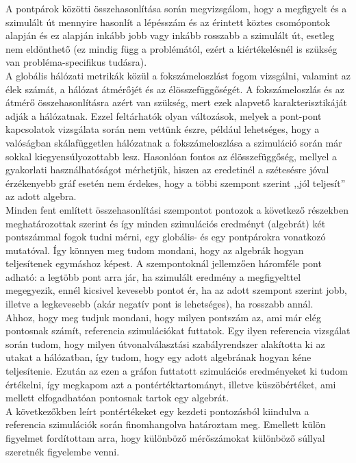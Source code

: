     A pontpárok közötti összehasonlítása során megvizsgálom, hogy a megfigyelt és a szimulált út mennyire hasonlít a lépésszám és az érintett köztes csomópontok alapján és ez alapján inkább jobb vagy inkább rosszabb a szimulált út, esetleg nem eldönthető (ez mindig függ a problémától, ezért a kiértékelésnél is szükség van probléma-specifikus tudásra).\\

    A globális hálózati metrikák közül a fokszámeloszlást fogom vizsgálni, valamint az élek számát, a hálózat átmérőjét és az élösszefüggőségét. A fokszámeloszlás és az átmérő összehasonlításra azért van szükség, mert ezek alapvető karakterisztikáját adják a hálózatnak. Ezzel feltárhatók olyan változások, melyek a pont-pont kapcsolatok vizsgálata során nem vettünk észre, például lehetséges, hogy a valóságban skálafüggetlen hálózatnak a fokszámeloszlása a szimuláció során már sokkal kiegyensúlyozottabb lesz. Hasonlóan fontos az élösszefüggőség, mellyel a gyakorlati használhatóságot mérhetjük, hiszen az eredetinél a szétesésre jóval érzékenyebb gráf esetén nem érdekes, hogy a többi szempont szerint ,,jól teljesít'' az adott algebra.\\

    Minden fent említett összehasonlítási szempontot pontozok a következő részekben meghatározottak szerint és így minden szimulációs eredményt (algebrát) két pontszámmal fogok tudni mérni, egy globális- és egy pontpárokra vonatkozó mutatóval. Így könnyen meg tudom mondani, hogy az algebrák hogyan teljesítenek egymáshoz képest. A szempontoknál jellemzően háromféle pont adható: a legtöbb pont arra jár, ha szimulált eredmény a megfigyelttel megegyezik, ennél kicsivel kevesebb pontot ér, ha az adott szempont szerint jobb, illetve a legkevesebb (akár negatív pont is lehetséges), ha rosszabb annál.\\

    Ahhoz, hogy meg tudjuk mondani, hogy milyen pontszám az, ami már elég pontosnak számít, referencia szimulációkat futtatok. Egy ilyen referencia vizsgálat során tudom, hogy milyen útvonalválasztási szabályrendszer alakította ki az utakat a hálózatban, így tudom, hogy egy adott algebrának hogyan kéne teljesítenie. Ezután az ezen a gráfon futtatott szimulációs eredményeket ki tudom értékelni, így megkapom azt a pontértéktartományt, illetve küszöbértéket, ami mellett elfogadhatóan pontosnak tartok egy algebrát.\\
    A következőkben leírt pontértékeket egy kezdeti pontozásból kiindulva a referencia szimulációk során finomhangolva határoztam meg. Emellett külön figyelmet fordítottam arra, hogy különböző mérőszámokat különböző súllyal szeretnék figyelembe venni.

